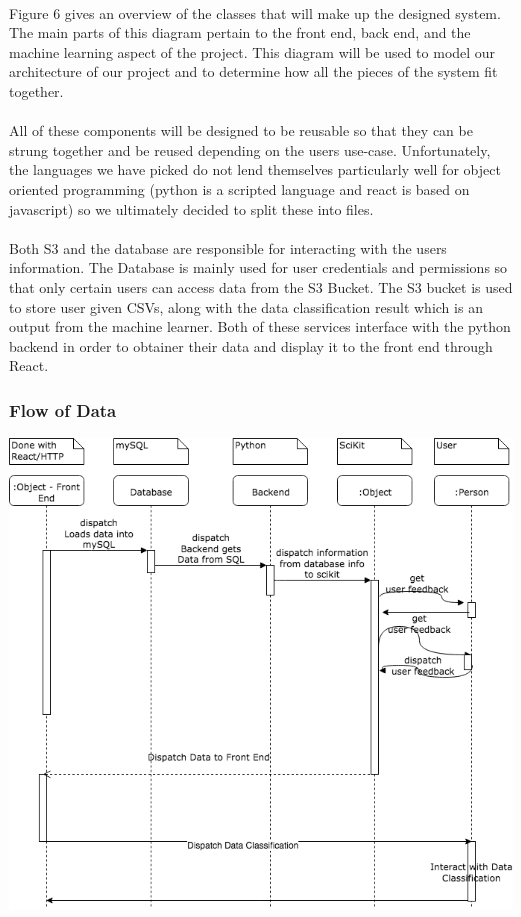 \documentclass[12pt,oneside,letterpaper]{article}
\begin{document}
\paragraph{}Figure 6 gives an overview of the classes that will make up the designed system. The main parts of this diagram pertain to the front end, back end, and the machine learning aspect of the project. This diagram will be used to model our architecture of our project and to determine how all the pieces of the system fit together. 
 \paragraph{} All of these components will be designed to be reusable so that they can be strung together and be reused depending on the users use-case. Unfortunately, the languages we have picked do not lend themselves particularly well for object oriented programming (python is a scripted language and react is based on javascript) so we ultimately decided to split these into files.
  \paragraph{} Both S3 and the database are responsible for interacting with the users information. The Database is mainly used for user credentials and permissions so that only certain users can access data from the S3 Bucket. The S3 bucket is used to store user given CSVs, along with the data classification result which is an output from the machine learner. Both of these services interface with the python backend in order to obtainer their data and display it to the front end through React.

\subsubsection{Flow of Data}
\includegraphics[scale = 0.52]{YarmSequenceDiagram.png}
\begingroup
{}
\endgroup
\end{document}
